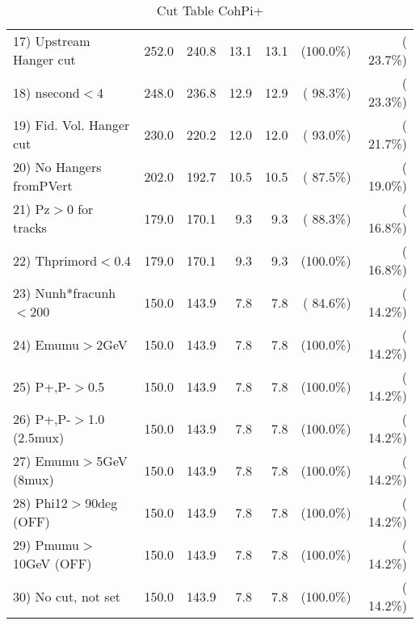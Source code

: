 \begin{table}[h!]
\begin{tabular}{||l||r|r|r|r|r|r||}
 17) Upstream Hanger cut  &        252.0 &        240.8 &         13.1 &         13.1 & (100.0\%) & ( 23.7\%) \\
 18) nsecond$<$4          &        248.0 &        236.8 &         12.9 &         12.9 & ( 98.3\%) & ( 23.3\%) \\
 19) Fid. Vol. Hanger cut &        230.0 &        220.2 &         12.0 &         12.0 & ( 93.0\%) & ( 21.7\%) \\
 20) No Hangers fromPVert &        202.0 &        192.7 &         10.5 &         10.5 & ( 87.5\%) & ( 19.0\%) \\
 21) Pz$>$0 for tracks    &        179.0 &        170.1 &          9.3 &          9.3 & ( 88.3\%) & ( 16.8\%) \\
 22) Thprimord$<$0.4      &        179.0 &        170.1 &          9.3 &          9.3 & (100.0\%) & ( 16.8\%) \\
 23) Nunh*fracunh$<$200   &        150.0 &        143.9 &          7.8 &          7.8 & ( 84.6\%) & ( 14.2\%) \\
 24) Emumu$>$2GeV         &        150.0 &        143.9 &          7.8 &          7.8 & (100.0\%) & ( 14.2\%) \\
 25) P+,P-$>$0.5          &        150.0 &        143.9 &          7.8 &          7.8 & (100.0\%) & ( 14.2\%) \\
 26) P+,P-$>$1.0 (2.5mux) &        150.0 &        143.9 &          7.8 &          7.8 & (100.0\%) & ( 14.2\%) \\
 27) Emumu$>$5GeV  (8mux) &        150.0 &        143.9 &          7.8 &          7.8 & (100.0\%) & ( 14.2\%) \\
 28) Phi12$>$90deg  (OFF) &        150.0 &        143.9 &          7.8 &          7.8 & (100.0\%) & ( 14.2\%) \\
 29) Pmumu$>$10GeV  (OFF) &        150.0 &        143.9 &          7.8 &          7.8 & (100.0\%) & ( 14.2\%) \\
 30) No cut, not set      &        150.0 &        143.9 &          7.8 &          7.8 & (100.0\%) & ( 14.2\%) \\
 \hline
 \hline
 \end{tabular}
 \caption{Cut Table  CohPi+   }
 \label{tab-cutcohjpsi-mumu_nuecc}
 \end{table}
